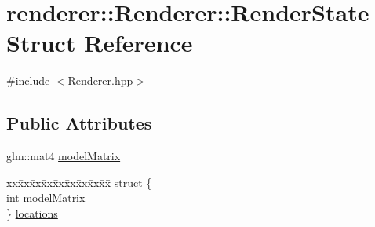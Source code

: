 \hypertarget{structrenderer_1_1Renderer_1_1RenderState}{\section{renderer\-:\-:Renderer\-:\-:Render\-State Struct Reference}
\label{structrenderer_1_1Renderer_1_1RenderState}
}


{\ttfamily \#include $<$Renderer.\-hpp$>$}

\subsection*{Public Attributes}
\begin{DoxyCompactItemize}
\item 
glm\-::mat4 \hyperlink{structrenderer_1_1Renderer_1_1RenderState_a9fbdbf3d5dbe35a048d01f41f1d9f49f}{model\-Matrix}
\item 
\begin{tabbing}
xx\=xx\=xx\=xx\=xx\=xx\=xx\=xx\=xx\=\kill
struct \{\\
\>int \hyperlink{structrenderer_1_1Renderer_1_1RenderState_a90fddf7b9069e609f9716510c68fe21d}{modelMatrix}\\
\} \hyperlink{structrenderer_1_1Renderer_1_1RenderState_aa750038563eb386163b945d56d7acc29}{locations}\\

\end{tabbing}\end{DoxyCompactItemize}


